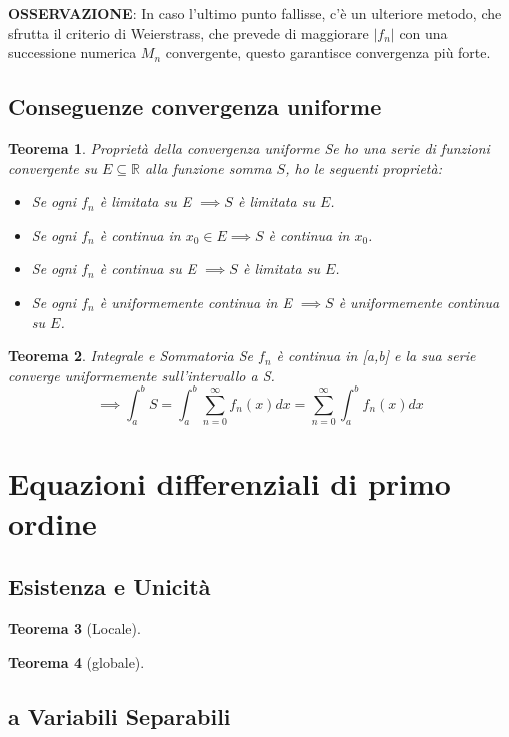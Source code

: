 \documentclass[a4paper]{article}
\newcommand{\numberset}{\mathbb}
\newcommand{\R}{\numberset{R}}
\theoremstyle{plain}
\newtheorem{Teo}{Teorema}
\begin{document}
\textbf{OSSERVAZIONE}: In caso l'ultimo punto fallisse, c'è un ulteriore metodo, che sfrutta il criterio
di Weierstrass, che prevede di maggiorare $|f_n|$ con una successione numerica $M_n$ convergente, questo garantisce 
convergenza più forte.

\subsection{Conseguenze convergenza uniforme}
\begin{Teo}{Proprietà della convergenza uniforme}
    Se ho una serie di funzioni convergente su $E\subseteq\R$ alla funzione somma $S$, 
    ho le seguenti proprietà:
    \begin{itemize}
        \item Se ogni $f_n$ è limitata su E $\implies S$ è limitata su $E$.
        \item Se ogni $f_n$ è continua in $x_0\in E\implies S$ è continua in $x_0$.
        \item Se ogni $f_n$ è continua su E $\implies S$ è limitata su $E$.
        \item Se ogni $f_n$ è uniformemente continua in E $\implies S$ è uniformemente continua su $E$.
    \end{itemize}
\end{Teo}
\begin{Teo}{Integrale e Sommatoria}
    Se $f_n$ è continua in [a,b] e la sua serie converge uniformemente sull'intervallo a S.
    $$\implies \int_a^b{S }=\int_a^b{\sum_{n=0}^\infty{f_n(x)}dx}=\sum_{n=0}^\infty{\int_a^b{f_n(x)dx}}$$
\end{Teo}

\section {Equazioni differenziali di primo ordine}
\subsection{Esistenza e Unicità}
\begin{Teo}[Locale]
    
\end{Teo}
\begin{Teo}[globale]
    
\end{Teo}

\subsection{a Variabili Separabili}
\end{document}
